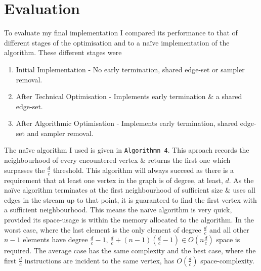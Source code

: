 \documentclass[11pt,twoside,a4paper]{report}
\begin{document}
\section{Evaluation}

To evaluate my final implementation I compared its performance to that of different stages of the optimisation and to a naïve implementation of the algorithm. These different stages were
\begin{enumerate}[label=\roman*)]
	\item Initial Implementation - No early termination, shared edge-set or sampler removal. %
	\item After Technical Optimisation - Implements early termination \& a shared edge-set. %
	\item After Algorithmic Optimisation - Implements early termination, shared edge-set and sampler removal. %
\end{enumerate}
The naïve algorithm I used is given in \texttt{Algorithmn 4}. This aproach records the neighbourhood of every encountered vertex \& returns the first one which surpasses the $\frac{d}c$ threshold. This algorithm will always succeed as there is a requirement that at least one vertex in the graph is of degree, at least, $d$. As the naïve algorithm terminates at the first neighbourhood of sufficient size \& uses all edges in the stream up to that point, it is guaranteed to find the first vertex with a sufficient neighbourhood. This means the naïve algorithm is very quick, provided its space-usage is within the memory allocated to the algorithm. In the worst case, where the last element is the only element of degree $\frac{d}c$ and all other $n-1$ elements have degree $\frac{d}c-1$, $\frac{d}{c}+(n-1)(\frac{d}c-1)\in O(n\frac{d}c)$ space is required. The average case has the same complexity and the best case, where the first $\frac{d}c$ instructions are incident to the same vertex, has $O(\frac{d}c)$ space-complexity.
\end{document}
